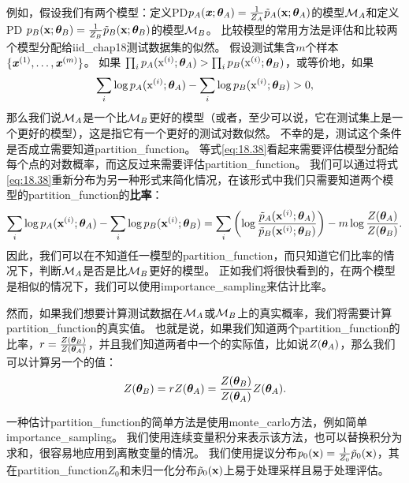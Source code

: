 例如，假设我们有两个模型：定义\gls{PD}$p_A(\boldsymbol{\mathit{x}}; \boldsymbol{\theta}_A)= \frac{1}{Z_A} \tilde{p}_A(\mathbf{x}; \boldsymbol{\theta}_A)$的模型$\mathcal{M}_A$和定义\gls{PD} $p_B(\mathbf{x}; \boldsymbol{\theta}_B)= \frac{1}{Z_B} \tilde{p}_B(\mathbf{x}; \boldsymbol{\theta}_B)$的模型$\mathcal{M}_B$。
比较模型的常用方法是评估和比较两个模型分配给\gls{iid_chap18}测试数据集的似然。
假设测试集含$m$个样本$\{ \boldsymbol{\mathit{x}}^{(1)}, \dots, \boldsymbol{\mathit{x}}^{(m)} \}$。
如果 $\prod_i p_A ( \mathrm{x}^{(i)}; \boldsymbol{\theta}_A) > \prod_i p_B( \mathrm{x}^{(i)}; \boldsymbol{\theta}_B)$，或等价地，如果
\begin{equation}
\label{eq:18.38}
	\sum_i \log p_A (\mathrm{x}^{(i)}; \boldsymbol{\theta}_A) - \sum_i \log p_B(\mathrm{x}^{(i)}; \boldsymbol{\theta}_B) > 0,
\end{equation}
那么我们说$\mathcal{M}_A$是一个比$\mathcal{M}_B$更好的模型（或者，至少可以说，它在测试集上是一个更好的模型），这是指它有一个更好的测试对数似然。
不幸的是，测试这个条件是否成立需要知道\gls{partition_function}。
等式\ref{eq:18.38}看起来需要评估模型分配给每个点的对数概率，而这反过来需要评估\gls{partition_function}。
我们可以通过将式\ref{eq:18.38}重新分布为另一种形式来简化情况，在该形式中我们只需要知道两个模型的\gls{partition_function}的\textbf{比率}：
\begin{equation}
\label{eq:18.39}
	\sum_i \log p_A(\mathbf{x}^{(i)}; \boldsymbol{\theta}_A) - \sum_i \log p_B(\mathbf{x}^{(i)}; \boldsymbol{\theta}_B) =
	\sum_i \left(  \log \frac{ \tilde{p}_A(\mathbf{x}^{(i)}; \boldsymbol{\theta}_A) }{ \tilde{p}_B(\mathbf{x}^{(i)}; \boldsymbol{\theta}_B) } \right)  - m\log \frac{Z(\boldsymbol{\theta}_A)}{ Z(\boldsymbol{\theta}_B) }.
\end{equation}
因此，我们可以在不知道任一模型的\gls{partition_function}，而只知道它们比率的情况下，判断$\mathcal{M}_A$是否是比$\mathcal{M}_B$更好的模型。
正如我们将很快看到的，在两个模型是相似的情况下，我们可以使用\gls{importance_sampling}来估计比率。


然而，如果我们想要计算测试数据在$\mathcal{M}_A$或$\mathcal{M}_B$上的真实概率，我们将需要计算\gls{partition_function}的真实值。
也就是说，如果我们知道两个\gls{partition_function}的比率，$r = \frac{Z(\boldsymbol{\theta}_B)}{ Z(\boldsymbol{\theta}_A) }$，并且我们知道两者中一个的实际值，比如说$Z(\boldsymbol{\theta}_A)$，那么我们可以计算另一个的值：
\begin{equation}
	Z(\boldsymbol{\theta}_B) = r Z(\boldsymbol{\theta}_A) = \frac{ Z(\boldsymbol{\theta}_B) }{ Z(\boldsymbol{\theta}_A) } Z(\boldsymbol{\theta}_A).
\end{equation}


一种估计\gls{partition_function}的简单方法是使用\gls{monte_carlo}方法，例如简单\gls{importance_sampling}。
我们使用连续变量积分来表示该方法，也可以替换积分为求和，很容易地应用到离散变量的情况。
我们使用提议分布$p_0(\mathbf{x}) = \frac{1}{Z_0} \tilde{p}_0( \mathbf{x})$，其在\gls{partition_function}$Z_0$和未归一化分布$\tilde{p}_0(\mathbf{x})$上易于处理采样且易于处理评估。

